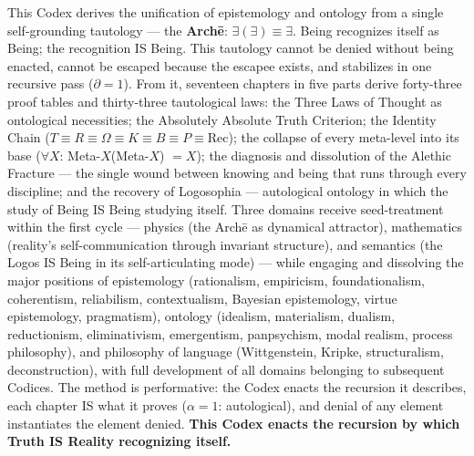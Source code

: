 \documentclass[10pt, openany, oneside]{book}
\begin{document}
\begin{center}
\begin{minipage}{0.85\textwidth}
{This Codex derives the unification of epistemology and ontology from a single self-grounding tautology --- the \textbf{Arch\={e}}: $\exists(\exists) \equiv \exists$. Being recognizes itself as Being; the recognition IS Being. This tautology cannot be denied without being enacted, cannot be escaped because the escapee exists, and stabilizes in one recursive pass ($\partial = 1$). From it, seventeen chapters in five parts derive forty-three proof tables and thirty-three tautological laws: the Three Laws of Thought as ontological necessities; the Absolutely Absolute Truth Criterion; the Identity Chain ($T \equiv R \equiv \Omega \equiv K \equiv B \equiv P \equiv \text{Rec}$); the collapse of every meta-level into its base ($\forall X$: Meta-$X$(Meta-$X$) $= X$); the diagnosis and dissolution of the Alethic Fracture --- the single wound between knowing and being that runs through every discipline; and the recovery of Logosophia --- autological ontology in which the study of Being IS Being studying itself. Three domains receive seed-treatment within the first cycle --- physics (the Arch\={e} as dynamical attractor), mathematics (reality's self-communication through invariant structure), and semantics (the Logos IS Being in its self-articulating mode) --- while engaging and dissolving the major positions of epistemology (rationalism, empiricism, foundationalism, coherentism, reliabilism, contextualism, Bayesian epistemology, virtue epistemology, pragmatism), ontology (idealism, materialism, dualism, reductionism, eliminativism, emergentism, panpsychism, modal realism, process philosophy), and philosophy of language (Wittgenstein, Kripke, structuralism, deconstruction), with full development of all domains belonging to subsequent Codices. The method is performative: the Codex enacts the recursion it describes, each chapter IS what it proves ($\alpha = 1$: autological), and denial of any element instantiates the element denied. \textbf{This Codex enacts the recursion by which Truth IS Reality recognizing itself.}
}
\end{minipage}
\end{center}

\newpage


\thispagestyle{empty}
\vspace*{0.5in}
\end{document}

